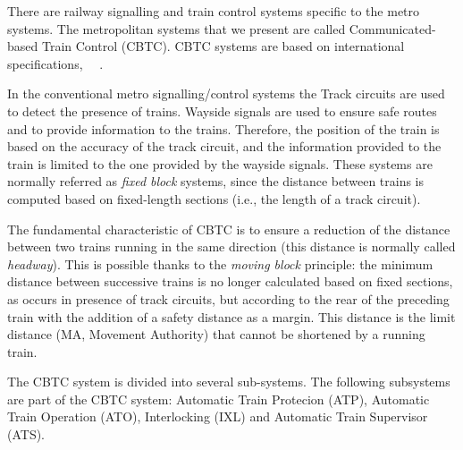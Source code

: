 \documentclass{ewic}
\begin{document}
			There are railway signalling and train control systems specific to the metro systems. The metropolitan systems that we present are called Communicated-based Train Control (CBTC). CBTC systems are based on international specifications,~\cite{ieee1474} ~\cite{cei2007}.
			
			In the conventional metro signalling/control systems the Track circuits are used to detect the presence of trains. Wayside signals are used to ensure safe routes and to provide information to the trains. Therefore, the position of the train is based on the accuracy of the track circuit, and the information provided to the train is limited to the one provided by the wayside signals. These systems are normally referred as \emph{fixed block} systems, since the distance between trains is computed based on fixed-length sections (i.e., the length of a track circuit).
			
			
			The fundamental characteristic of CBTC is to ensure a reduction of the distance between two trains running in the same direction (this distance is normally called \emph{headway}). This is possible thanks to the \emph{moving block} principle: the minimum distance between successive trains is no longer calculated based on fixed sections, as occurs in presence of track circuits, but according to the rear of the preceding train with the addition of a safety distance as a margin. This distance is the limit distance (MA, Movement Authority) that cannot be shortened by a running train. 
			
			
			The CBTC system is divided into several sub-systems. The following subsystems are part of the CBTC system: Automatic Train Protecion (ATP), Automatic Train Operation (ATO), Interlocking (IXL) and Automatic Train Supervisor (ATS).
			
			 
\end{document}
